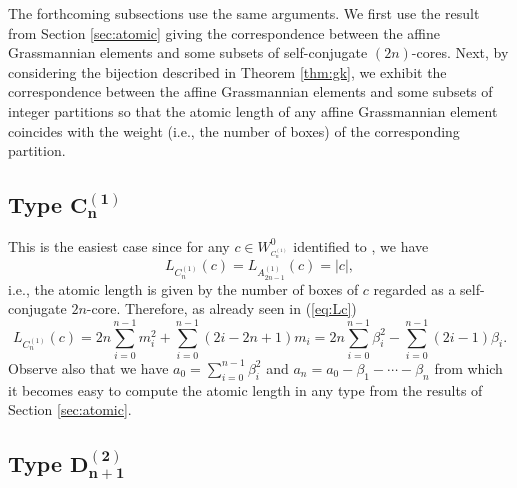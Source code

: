 \documentclass[10pt,a4paper]{amsart}
\numberwithin{equation}{section}
\begin{document}

%

The forthcoming subsections use the same arguments. We first use the result
from Section \ref{sec:atomic} giving the correspondence between the affine
Grassmannian elements and some subsets of self-conjugate $(2n)$-cores. Next,
by considering the bijection described in Theorem \ref{thm:gk}, we exhibit
the correspondence between the affine Grassmannian elements and some subsets
of integer partitions so that the atomic length of any affine Grassmannian
element coincides with the weight (i.e., the number of boxes) of the
corresponding partition.

\subsection[Type C\_n\^{}(1)]{Type $\boldsymbol{C_{n}^{(1)}}$}

This is the easiest case since for any $c\in W_{^{C_{n}^{(1)}}}^{0}$ identified to , we have
\[
L_{C_{n}^{(1)}}(c)=L_{A_{2n-1}^{(1)}}(c)= \vert c \vert ,
\] i.e., the
atomic length is given by the number of boxes of $c$ regarded as a
self-conjugate $2n$-core. Therefore, as already seen in (\ref{eq:Lc})%
\begin{equation*}
L_{C_{n}^{(1)}}(c)=2n\sum_{i=0}^{n-1}m_{i}^{2}+%
\sum_{i=0}^{n-1}(2i-2n+1)m_{i}=2n\sum_{i=0}^{n-1}\beta
_{i}^{2}-\sum_{i=0}^{n-1}(2i-1)\beta _{i}. %
\end{equation*}%
Observe also that we have $a_{0}=\sum_{i=0}^{n-1}\beta _{i}^{2}$ and $%
a_{n}=a_{0}-\beta _{1}-\cdots -\beta _{n}$ from which it becomes easy to
compute the atomic length in any type from the results of Section \ref{sec:atomic}.

\subsection[Type D\_\{n+1\}\^{}(2)]{Type $\boldsymbol{D_{n+1}^{(2)}}$}
\end{document}
